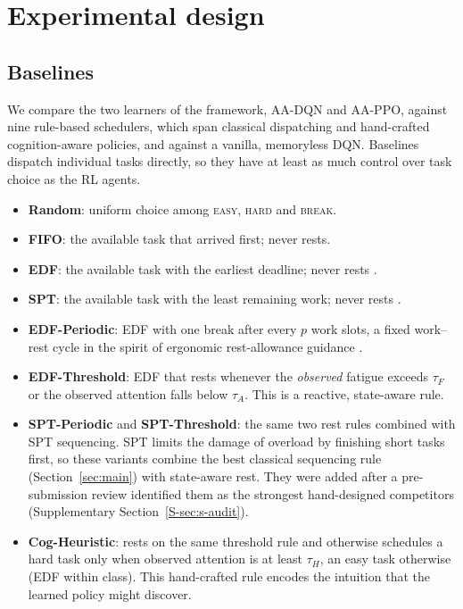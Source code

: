 \section{Experimental design}\label{sec:setup}

\subsection{Baselines}\label{sec:baselines}
We compare the two learners of the framework, AA-DQN and AA-PPO, against nine rule-based schedulers, which span classical dispatching and hand-crafted cognition-aware policies, and against a vanilla, memoryless DQN. Baselines dispatch individual tasks directly, so they have at least as much control over task choice as the RL agents.
\begin{itemize}
  \item \textbf{Random}: uniform choice among \textsc{easy}, \textsc{hard} and \textsc{break}.
  \item \textbf{FIFO}: the available task that arrived first; never rests.
  \item \textbf{EDF}: the available task with the earliest deadline; never rests \cite{jackson1955,liu1973}.
  \item \textbf{SPT}: the available task with the least remaining work; never rests \cite{smith1956}.
  \item \textbf{EDF-Periodic}: EDF with one break after every $p$ work slots, a fixed work--rest cycle in the spirit of ergonomic rest-allowance guidance \cite{konz1998}.
  \item \textbf{EDF-Threshold}: EDF that rests whenever the \emph{observed} fatigue exceeds $\tau_F$ or the observed attention falls below $\tau_A$. This is a reactive, state-aware rule.
  \item \textbf{SPT-Periodic} and \textbf{SPT-Threshold}: the same two rest rules combined with SPT sequencing. SPT limits the damage of overload by finishing short tasks first, so these variants combine the best classical sequencing rule (Section~\ref{sec:main}) with state-aware rest. They were added after a pre-submission review identified them as the strongest hand-designed competitors (Supplementary Section~\ref{S-sec:s-audit}).
  \item \textbf{Cog-Heuristic}: rests on the same threshold rule and otherwise schedules a hard task only when observed attention is at least $\tau_H$, an easy task otherwise (EDF within class). This hand-crafted rule encodes the intuition that the learned policy might discover.
\end{itemize}
